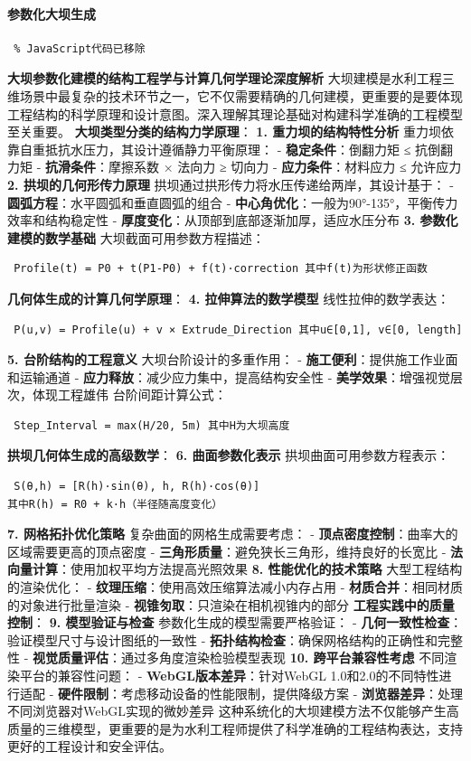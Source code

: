 \paragraph{参数化大坝生成}\label{ux53c2ux6570ux5316ux5927ux575dux751fux6210} \begin{lstlisting} % JavaScript代码已移除
\end{lstlisting} \textbf{大坝参数化建模的结构工程学与计算几何学理论深度解析}
大坝建模是水利工程三维场景中最复杂的技术环节之一，它不仅需要精确的几何建模，更重要的是要体现工程结构的科学原理和设计意图。深入理解其理论基础对构建科学准确的工程模型至关重要。 \textbf{大坝类型分类的结构力学原理}：
\textbf{1. 重力坝的结构特性分析} 重力坝依靠自重抵抗水压力，其设计遵循静力平衡原理： - \textbf{稳定条件}：倒翻力矩 ≤ 抗倒翻力矩 - \textbf{抗滑条件}：摩擦系数 × 法向力 ≥ 切向力 -
\textbf{应力条件}：材料应力 ≤ 允许应力 \textbf{2. 拱坝的几何形传力原理} 拱坝通过拱形传力将水压传递给两岸，其设计基于： - \textbf{圆弧方程}：水平圆弧和垂直圆弧的组合 -
\textbf{中心角优化}：一般为90°-135°，平衡传力效率和结构稳定性 - \textbf{厚度变化}：从顶部到底部逐渐加厚，适应水压分布 \textbf{3. 参数化建模的数学基础} 大坝截面可用参数方程描述：
\begin{lstlisting} Profile(t) = P0 + t(P1-P0) + f(t)·correction 其中f(t)为形状修正函数 \end{lstlisting} \textbf{几何体生成的计算几何学原理}：
\textbf{4. 拉伸算法的数学模型} 线性拉伸的数学表达： \begin{lstlisting} P(u,v) = Profile(u) + v × Extrude_Direction 其中u∈[0,1], v∈[0, length]
\end{lstlisting} \textbf{5. 台阶结构的工程意义} 大坝台阶设计的多重作用： - \textbf{施工便利}：提供施工作业面和运输通道 - \textbf{应力释放}：减少应力集中，提高结构安全性 -
\textbf{美学效果}：增强视觉层次，体现工程雄伟 台阶间距计算公式： \begin{lstlisting} Step_Interval = max(H/20, 5m) 其中H为大坝高度 \end{lstlisting}
\textbf{拱坝几何体生成的高级数学}： \textbf{6. 曲面参数化表示} 拱坝曲面可用参数方程表示： \begin{lstlisting} S(θ,h) = [R(h)·sin(θ), h, R(h)·cos(θ)]
其中R(h) = R0 + k·h（半径随高度变化） \end{lstlisting} \textbf{7. 网格拓扑优化策略} 复杂曲面的网格生成需要考虑： - \textbf{顶点密度控制}：曲率大的区域需要更高的顶点密度 -
\textbf{三角形质量}：避免狭长三角形，维持良好的长宽比 - \textbf{法向量计算}：使用加权平均方法提高光照效果 \textbf{8. 性能优化的技术策略} 大型工程结构的渲染优化： -
\textbf{纹理压缩}：使用高效压缩算法减小内存占用 - \textbf{材质合并}：相同材质的对象进行批量渲染 - \textbf{视锥匇取}：只渲染在相机视锥内的部分 \textbf{工程实践中的质量控制}： \textbf{9.
模型验证与检查} 参数化生成的模型需要严格验证： - \textbf{几何一致性检查}：验证模型尺寸与设计图纸的一致性 - \textbf{拓扑结构检查}：确保网格结构的正确性和完整性 -
\textbf{视觉质量评估}：通过多角度渲染检验模型表现 \textbf{10. 跨平台兼容性考虑} 不同渲染平台的兼容性问题： - \textbf{WebGL版本差异}：针对WebGL 1.0和2.0的不同特性进行适配 -
\textbf{硬件限制}：考虑移动设备的性能限制，提供降级方案 - \textbf{浏览器差异}：处理不同浏览器对WebGL实现的微妙差异
这种系统化的大坝建模方法不仅能够产生高质量的三维模型，更重要的是为水利工程师提供了科学准确的工程结构表达，支持更好的工程设计和安全评估。
